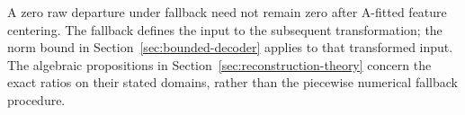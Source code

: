 A zero raw departure under fallback need not remain zero after A-fitted
feature centering. The fallback defines the input to the subsequent
transformation; the norm bound in Section~\ref{sec:bounded-decoder}
applies to that transformed input. The algebraic propositions in
Section~\ref{sec:reconstruction-theory} concern the exact ratios on their stated
domains, rather than the piecewise numerical fallback procedure.
